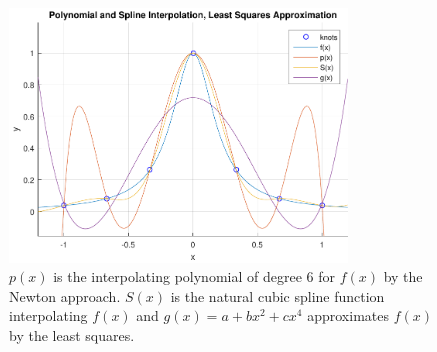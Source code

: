\documentclass{article}
\begin{document}
\begin{enumerate}
\begin{figure}
  \centering
  \includegraphics[width=0.8\textwidth]{q2plotv}
  \caption{$p(x)$ is the interpolating polynomial of degree 6 for $f(x)$ by the Newton approach. $S(x)$ is the natural cubic spline function interpolating $f(x)$ and $g(x) = a + bx^2 + cx^4$ approximates $f(x)$ by the least squares.}
  \label{fig:q2plot}
\end{figure}

\end{enumerate}
\end{document}
